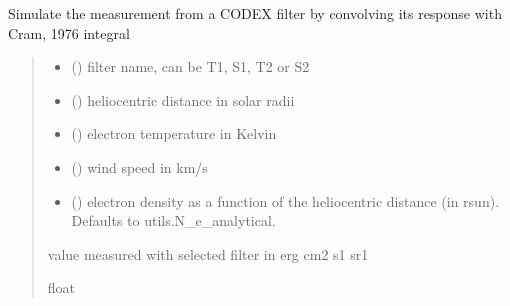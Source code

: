 \documentclass[letterpaper,10pt,english]{sphinxmanual}
\begin{document}
\begin{fulllineitems}
\label{\detokenize{doppler_dimming_lib:doppler_dimming_lib.codex.simulate_codex_filter}}
\pysigstartsignatures
{}
\pysigstopsignatures
\sphinxAtStartPar
Simulate the measurement from a CODEX filter by convolving its response with Cram, 1976 integral
\begin{quote}\begin{description}
\begin{itemize}
\item {} 
\sphinxAtStartPar
{} () \textendash{} filter name, can be T1, S1, T2 or S2

\item {} 
\sphinxAtStartPar
{} () \textendash{} heliocentric distance in solar radii

\item {} 
\sphinxAtStartPar
{} () \textendash{} electron temperature in Kelvin

\item {} 
\sphinxAtStartPar
{} () \textendash{} wind speed in km/s

\item {} 
\sphinxAtStartPar
{} (\sphinxstyleliteralemphasis{\sphinxupquote{, }}) \textendash{} electron density as a function of the heliocentric distance (in rsun). Defaults to utils.N\_e\_analytical.

\end{itemize}

\sphinxAtStartPar
value measured with selected filter in erg cm\sphinxhyphen{}2 s\sphinxhyphen{}1 sr\sphinxhyphen{}1

\sphinxAtStartPar
float

\end{description}\end{quote}

\end{fulllineitems}
\end{document}
